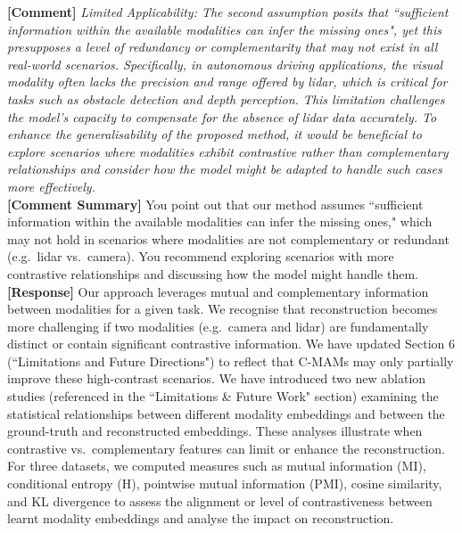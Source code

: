 \documentclass{article}
\begin{document}
\vspace{0.25cm}
\hline 
\vspace{0.25cm}

\noindent\textbf{[Comment]} \textit{Limited Applicability: The second assumption posits that ``sufficient information within the available modalities can infer
the missing ones", yet this presupposes a level of redundancy or complementarity that may not exist in all real-world scenarios. Specifically, in autonomous driving applications, the visual modality often lacks the precision and range offered by lidar, which is critical for tasks such as obstacle detection and depth perception. This limitation challenges the model's capacity to compensate for the absence of lidar data accurately. To enhance the generalisability of the proposed method, it would be beneficial to explore scenarios where modalities exhibit contrastive rather than complementary relationships and consider how the model might be adapted to handle such cases more effectively.}
\\

\noindent\textbf{[Comment Summary]} You point out that our method assumes ``sufficient information within the available modalities can infer the missing ones," which may not hold in scenarios where modalities are not complementary or redundant (e.g.\ lidar vs.\ camera). You recommend exploring scenarios with more contrastive relationships and discussing how the model might handle them.
\\

\noindent\textbf{[Response]} Our approach leverages mutual and complementary information between modalities for a given task. We recognise that reconstruction becomes more challenging if two modalities (e.g.\ camera and lidar) are fundamentally distinct or contain significant contrastive information. We have updated Section 6 (``Limitations and Future Directions") to reflect that C-MAMs may only partially improve these high-contrast scenarios. We have introduced two new ablation studies (referenced in the ``Limitations \& Future Work" section) examining the statistical relationships between different modality embeddings and between the ground-truth and reconstructed embeddings. These analyses illustrate when contrastive vs.\ complementary features can limit or enhance the reconstruction. For three datasets, we computed measures such as mutual information (MI), conditional entropy (H), pointwise mutual information (PMI),
cosine similarity, and KL divergence to assess the alignment or level of contrastiveness between learnt modality embeddings and analyse the impact on reconstruction.
\end{document}

